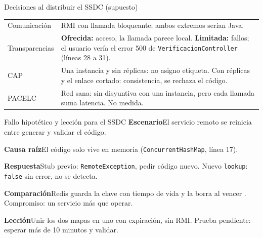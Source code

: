 \begin{frame}{Decisiones al distribuir el SSDC (supuesto)}\relax
\small
\begin{tabularx}{\linewidth}{@{}lX@{}}
\toprule
Comunicación & RMI con llamada bloqueante; ambos extremos serían Java.\\
Transparencias & \textbf{Ofrecida:} acceso, la llamada parece local. \textbf{Limitada:} fallos; el usuario vería el error 500 de \texttt{VerificacionController} (líneas 28 a 31).\\
CAP & Una instancia y sin réplicas: no asigno etiqueta. Con réplicas y el enlace cortado: consistencia, se rechaza el código.\\
PACELC & Red sana: sin disyuntiva con una instancia, pero cada llamada suma latencia. No medida.\\
\bottomrule
\end{tabularx}
\end{frame}

\begin{frame}{Fallo hipotético y lección para el SSDC}\relax
\small
\textbf{Escenario}\quad El servicio remoto se reinicia entre generar y validar el código.\par\smallskip
\textbf{Causa raíz}\quad El código solo vive en memoria (\texttt{ConcurrentHashMap}, línea 17).\par\smallskip
\textbf{Respuesta}\quad Stub previo: \texttt{RemoteException}, pedir código nuevo. Nuevo \texttt{lookup}: \texttt{false} sin error, no se detecta.\par\smallskip
\textbf{Comparación}\quad Redis guarda la clave con tiempo de vida y la borra al vencer \cite{redisexpire}. Compromiso: un servicio más que operar.\par\smallskip
\textbf{Lección}\quad Unir los dos mapas en uno con expiración, sin RMI. Prueba pendiente: esperar más de 10 minutos y validar.\par
\end{frame}
